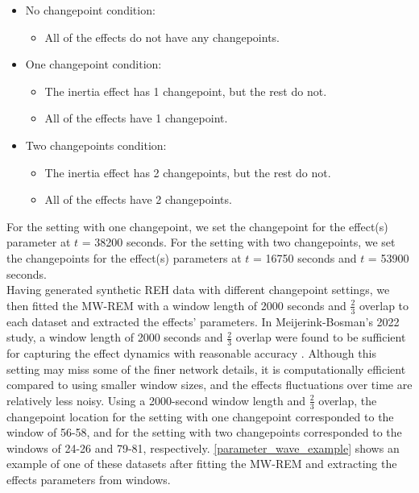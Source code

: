 \documentclass[]{interact}
\theoremstyle{plain}%
\theoremstyle{definition}
\theoremstyle{remark}
\begin{document}
    \begin{itemize} \label{data cate}
    	\item No changepoint condition:
    	\begin{itemize}
    		\item All of the effects do not have any changepoints. \\
    	\end{itemize}
    	\item One changepoint condition:
    	\begin{itemize}
    		\item The inertia effect has 1 changepoint, but the rest do not.
    		\item All of the effects have 1 changepoint. \\
    	\end{itemize}
    	\item Two changepoints condition:
    	\begin{itemize}
    		\item The inertia effect has 2 changepoints, but the rest do not.
    		\item All of the effects have 2 changepoints.
    	\end{itemize}
    \end{itemize}
    
    For the setting with one changepoint, we set the changepoint for the effect(s) parameter at $t$ = 38200 seconds. For the setting with two changepoints, we set the changepoints for the effect(s) parameters at $t$ = 16750 seconds and $t$ = 53900 seconds. \\
    
    Having generated synthetic REH data with different changepoint settings, we then fitted the MW-REM with a window length of 2000 seconds and $\frac{2}{3}$ overlap to each dataset and extracted the effects' parameters. In Meijerink-Bosman's 2022 study, a window length of 2000 seconds and $\frac{2}{3}$ overlap were found to be sufficient for capturing the effect dynamics with reasonable accuracy \cite{meijerink-bosmanDynamicRelationalEvent2022}. Although this setting may miss some of the finer network details, it is computationally efficient compared to using smaller window sizes, and the effects fluctuations over time are relatively less noisy. Using a 2000-second window length and $\frac{2}{3}$ overlap, the changepoint location for the setting with one changepoint corresponded to the window of 56-58, and for the setting with two changepoints corresponded to the windows of 24-26 and 79-81, respectively. \autoref{parameter_wave_example} shows an example of one of these datasets after fitting the MW-REM and extracting the effects parameters from windows.
\end{document}
